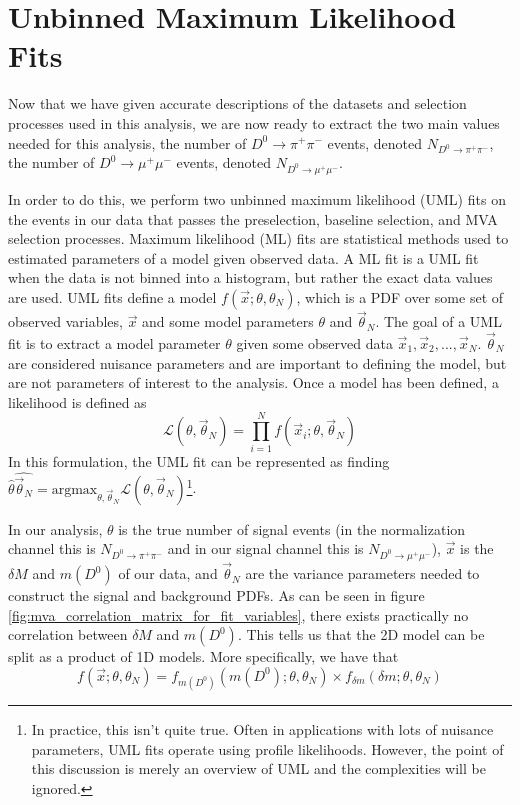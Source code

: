 \section{Unbinned Maximum Likelihood Fits}
\label{sec:UML}

Now that we have given accurate descriptions of the datasets and selection processes used in this analysis, we are now ready to extract the two main values needed for this analysis, the number of $D^0 \to \pi^+ \pi^-$ events, denoted $N_{D^0 \to \pi^+ \pi^-}$, the number of $D^0 \to \mu^+ \mu^-$ events, denoted $N_{D^0 \to \mu^+ \mu^-}$.

In order to do this, we perform two unbinned maximum likelihood (UML) fits on the events in our data that passes the preselection, baseline selection, and MVA selection processes. Maximum likelihood (ML) fits are statistical methods used to estimated parameters of a model given observed data. A ML fit is a UML fit when the data is not binned into a histogram, but rather the exact data values are used. UML fits define a model $f(\vec{x}; \theta, \theta_N)$, which is a PDF over some set of observed variables, $\vec{x}$ and some model parameters $\theta$ and $\vec{\theta}_N$. The goal of a UML fit is to extract a model parameter $\theta$ given some observed data $\vec{x}_1, \vec{x}_2,...,\vec{x}_N$. $\vec{\theta}_N$ are considered nuisance parameters and are important to defining the model, but are not parameters of interest to the analysis. Once a model has been defined, a likelihood is defined as
\begin{equation}
    \mathcal{L}(\theta, \vec{\theta}_N) = \prod^N_{i=1} f(\vec{x}_i; \theta, \vec{\theta}_N)
\end{equation}
In this formulation, the UML fit can be represented as finding $\hat{\theta} \hat{\vec{\theta}_N}= \text{argmax}_{\theta, \vec{\theta}_N} \mathcal{L}(\theta, \vec{\theta}_N)$\footnote{In practice, this isn't quite true. Often in applications with lots of nuisance parameters, UML fits operate using profile likelihoods. However, the point of this discussion is merely an overview of UML and the complexities will be ignored.}. 

In our analysis, $\theta$ is the true number of signal events (in the normalization channel this is $N_{D^0 \to \pi^+ \pi^-}$ and in our signal channel this is $N_{D^0 \to \mu^+ \mu^-}$), $\vec{x}$ is the $\delta M$ and $m(D^0)$ of our data, and $\vec{\theta}_N$ are the variance parameters needed to construct the signal and background PDFs. As can be seen in figure \ref{fig:mva_correlation_matrix_for_fit_variables}, there exists practically no correlation between $\delta M$ and $m(D^0)$. This tells us that the 2D model can be split as a product of 1D models. More specifically, we have that
\begin{equation}
    f(\vec{x}; \theta, \theta_N) = f_{m(D^0)}(m(D^0); \theta, \theta_N) \times f_{\delta m}(\delta m; \theta, \theta_N)
\end{equation}

